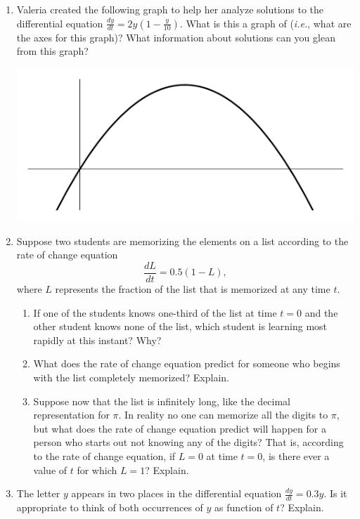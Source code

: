 \begin{enumerate}
\item Valeria created the following graph to help her analyze solutions to the differential equation $\displaystyle \frac{dy}{dt} = 2y \left(1-\frac{y}{10} \right)$. What is this a graph of ({\em i.e.}, what are the axes for this graph)? What information about solutions can you glean from this graph? \label{01HWproblem3}
\begin{center}
\includegraphics[width=5in]{01/01ValeriaGraph.pdf}
\end{center}

\item  Suppose two students are memorizing the elements on a list according to the rate of change equation \[\frac{dL}{dt}=0.5(1-L),\] where $L$ represents the fraction of the list that is memorized at any time $t$.
\begin{enumerate}
\item	If one of the students knows one-third of the list at time $t = 0$ and the other student knows none of the list, which student is learning most rapidly at this instant? Why?
\item	What does the rate of change equation predict for someone who begins with the list completely memorized? Explain.
\item	Suppose now that the list is infinitely long, like the decimal representation for $\pi$. In reality no one can memorize all the digits to $\pi$, but what does the rate of change equation predict will happen for a person who starts out not knowing any of the digits? That is, according to the rate of change equation, if $L = 0$ at time $t = 0$, is there ever a value of $t$ for which $L = 1$? Explain. 

\end{enumerate}

\item The letter $y$ appears in two places in the differential equation $ \displaystyle \frac{dy}{dt} = 0.3y.$
Is it appropriate to think of both occurrences of $y$ as function of $t$? Explain.



\end{enumerate}
